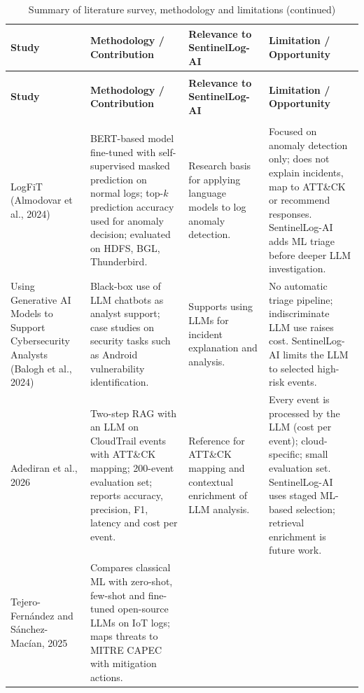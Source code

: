 \documentclass[12pt,a4paper]{report}
\renewcommand{\arraystretch}{1.05}
\begin{document}
\footnotesize
\renewcommand{\arraystretch}{1.25}
\begin{longtable}{@{}>{\raggedright\arraybackslash}p{2.5cm} >{\raggedright\arraybackslash}p{4.5cm} >{\raggedright\arraybackslash}p{4cm} >{\raggedright\arraybackslash}p{4cm}@{}}
\caption{Summary of literature survey, methodology and limitations}
\label{tab:litsurvey}\\
\toprule
\textbf{Study} & \textbf{Methodology / Contribution} & \textbf{Relevance to SentinelLog-AI} & \textbf{Limitation / Opportunity}\\
\midrule
\endfirsthead
\caption[]{Summary of literature survey, methodology and limitations (continued)}\\
\toprule
\textbf{Study} & \textbf{Methodology / Contribution} & \textbf{Relevance to SentinelLog-AI} & \textbf{Limitation / Opportunity}\\
\midrule
\endhead
\midrule
\multicolumn{4}{r}{Continued on next page}\\
\endfoot
\bottomrule
\endlastfoot
LogFiT (Almodovar et al., 2024)~\cite{logfit} &
BERT-based model fine-tuned with self-supervised masked prediction on normal logs; top-$k$ prediction accuracy used for anomaly decision; evaluated on HDFS, BGL, Thunderbird. &
Research basis for applying language models to log anomaly detection. &
Focused on anomaly detection only; does not explain incidents, map to ATT\&CK or recommend responses. SentinelLog-AI adds ML triage before deeper LLM investigation.\\
Using Generative AI Models to Support Cybersecurity Analysts (Balogh et al., 2024)~\cite{balogh2024} &
Black-box use of LLM chatbots as analyst support; case studies on security tasks such as Android vulnerability identification. &
Supports using LLMs for incident explanation and analysis. &
No automatic triage pipeline; indiscriminate LLM use raises cost. SentinelLog-AI limits the LLM to selected high-risk events.\\
Adediran et al., 2026~\cite{adediran2026} &
Two-step RAG with an LLM on CloudTrail events with ATT\&CK mapping; 200-event evaluation set; reports accuracy, precision, F1, latency and cost per event. &
Reference for ATT\&CK mapping and contextual enrichment of LLM analysis. &
Every event is processed by the LLM (cost per event); cloud-specific; small evaluation set. SentinelLog-AI uses staged ML-based selection; retrieval enrichment is future work.\\
Tejero-Fern\'andez and S\'anchez-Mac\'ian, 2025~\cite{tejero2025} &
Compares classical ML with zero-shot, few-shot and fine-tuned open-source LLMs on IoT logs; maps threats to MITRE CAPEC with mitigation actions. &

\end{longtable}
\end{document}
